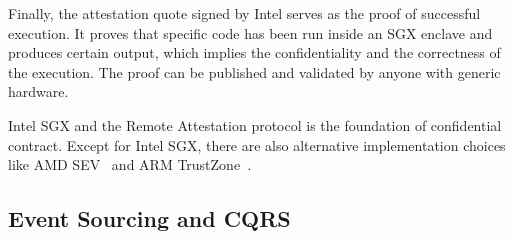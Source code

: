 Finally, the attestation quote signed by Intel serves as the proof of successful execution. It proves that specific code has been run inside an SGX enclave and produces certain output, which implies the confidentiality and the correctness of the execution. The proof can be published and validated by anyone with generic hardware.

Intel SGX and the Remote Attestation protocol is the foundation of confidential contract. Except for Intel SGX, there are also alternative implementation choices like AMD SEV~\cite{xxx} and ARM TrustZone~\cite{xxx}.

\subsection{Event Sourcing and CQRS}


